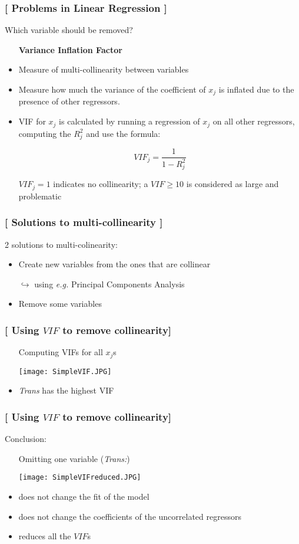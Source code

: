 \documentclass[xcolor=x11names,compress]{beamer}
\renewcommand{\(}{\begin{columns}}
\renewcommand{\)}{\end{columns}}
\newcommand{\<}[1]{\begin{column}{#1}}
\renewcommand{\>}{\end{column}}
\begin{document}
\begin{frame} %
\frametitle{\textcolor{brique}{[ Problems in Linear Regression ]}}
 Which variable should be removed?
 \pause
\begin{itemize}[<+->]
  \item[] \textbf{Variance Inflation Factor}
  \item Measure of multi-collinearity between variables
  \item Measure how much the variance of the coefficient of $x_j$ is inflated due to the presence of other regressors.
  \item VIF for  $x_j$ is calculated by running a regression of $x_j$ on all other regressors, computing the $R_j^2$ and use the formula:
  \item[] $$
  VIF_j  = \frac{1}{1 - R^2_j}
  $$
  \item[] $VIF_j = 1$ indicates no collinearity; a $VIF \geq 10$  is considered as large and problematic
\end{itemize}
\end{frame}

\begin{frame} %
\frametitle{\textcolor{brique}{[ Solutions to multi-collinearity ]}}
2 solutions to multi-colinearity:
\pause
\begin{itemize}[<+->]
  \item Create new variables from the ones that are collinear
  \item[$\hookrightarrow$] using \textit{e.g.} Principal Components Analysis
  \item Remove some variables
\end{itemize}
\end{frame}


\begin{frame} %
\frametitle{\textcolor{brique}{[ Using $VIF$ to remove collinearity]}}
\pause
\begin{itemize}[<+->]
  \item[]Computing VIFs for all $x_j$s
  \item[] \texttt{[image: SimpleVIF.JPG]} \\
\item  \emph{Trans} has the highest VIF
\end{itemize}
\end{frame}


\begin{frame} %
\frametitle{\textcolor{brique}{[ Using $VIF$ to remove collinearity]}}
Conclusion:
\pause
\begin{itemize}[<+->]
  \item[] Omitting one variable (\textit{Trans:})
  \item[] \texttt{[image: SimpleVIFreduced.JPG]} \\
 \item  does not change the fit of the model
 \item  does not change the coefficients of the uncorrelated regressors
 \item reduces all the $VIF$s
\end{itemize}
\end{frame}
\end{document}
